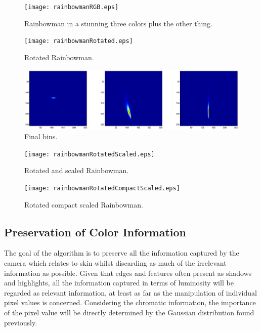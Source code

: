 \documentclass[10pt,a4paper]{article}
\begin{document}
\begin{figure}[h!]
  \caption{Rainbowman in a stunning three colors plus the other thing.}
  \centering
    \texttt{[image: rainbowmanRGB.eps]}
\end{figure}

\begin{figure}[h!]
  \caption{Rotated Rainbowman.}
  \centering
    \texttt{[image: rainbowmanRotated.eps]}
\end{figure}

\begin{figure}[h!]
  \caption{Final bins.}
  \centering
    \includegraphics[width=\textwidth]{binsFinal2.eps}
\end{figure}

\begin{figure}[h!]
  \caption{Rotated and scaled Rainbowman.}
  \centering
    \texttt{[image: rainbowmanRotatedScaled.eps]}
\end{figure}

\begin{figure}[h!]
  \caption{Rotated compact scaled Rainbowman.}
  \centering
    \texttt{[image: rainbowmanRotatedCompactScaled.eps]}
\end{figure}


\subsection{Preservation of Color Information}\label{sec:PreservationOfColorInformation}

The goal of the algorithm is to preserve all the information captured by the camera which relates to skin whilst discarding as much of the irrelevant information as possible. Given that edges and features often present as shadows and highlights, all the information captured in terms of luminosity will be regarded as relevant information, at least as far as the manipulation of individual pixel values is concerned. Considering the chromatic information, the importance of the pixel value will be directly determined by the Gaussian distribution found previously.
\end{document}
